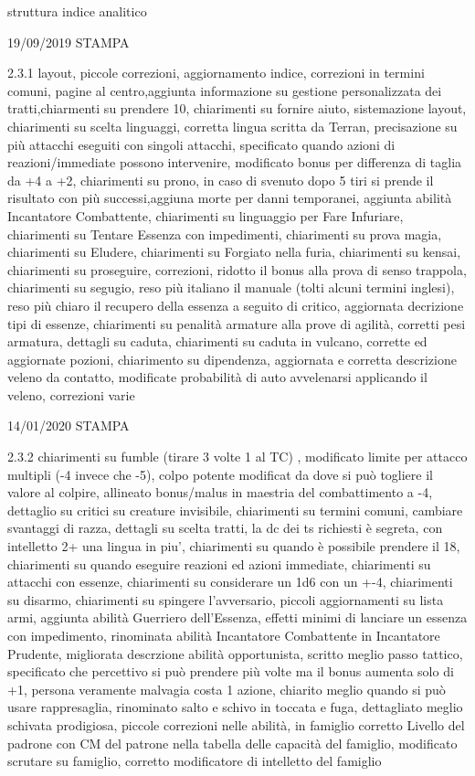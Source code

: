 \documentclass[a4paper,11pt,twoside,openany]{book}
\begin{document}
{{struttura indice analitico

19/09/2019 STAMPA

2.3.1 layout, piccole correzioni, aggiornamento indice, correzioni in termini comuni, pagine al centro,aggiunta informazione su gestione personalizzata dei tratti,chiarmenti su prendere 10, chiarimenti su fornire aiuto, sistemazione layout, chiarimenti su scelta linguaggi, corretta lingua scritta da Terran, precisazione su più attacchi eseguiti con singoli attacchi, specificato quando azioni di reazioni/immediate possono intervenire, modificato bonus per differenza di taglia da +4 a +2, chiarimenti su prono, in caso di svenuto dopo 5 tiri si prende il risultato con più successi,aggiuna morte per danni temporanei, aggiunta abilità Incantatore Combattente, chiarimenti su linguaggio per Fare Infuriare, chiarimenti su Tentare Essenza con impedimenti, chiarimenti su prova magia, chiarimenti su Eludere, chiarimenti su Forgiato nella furia, chiarimenti su kensai, chiarimenti su proseguire, correzioni, ridotto il bonus alla prova di senso trappola, chiarimenti su segugio, reso più italiano il manuale (tolti alcuni termini inglesi), reso più chiaro il recupero della essenza a seguito di critico, aggiornata decrizione tipi di essenze, chiarimenti su penalità armature alla prove di agilità, corretti pesi armatura, dettagli su caduta, chiarimenti su caduta in vulcano, corrette ed aggiornate pozioni, chiarimento su dipendenza, aggiornata e corretta descrizione veleno da contatto, modificate probabilità di auto avvelenarsi applicando il veleno, correzioni varie

14/01/2020 STAMPA

2.3.2 chiarimenti su fumble (tirare 3 volte 1 al TC) , modificato limite per attacco multipli (-4 invece che -5), colpo potente modificat da dove si può togliere il valore al colpire, allineato bonus/malus in maestria del combattimento a -4, dettaglio su critici su creature invisibile, chiarimenti su termini comuni, cambiare svantaggi di razza, dettagli su scelta tratti, la dc dei ts richiesti è segreta, con intelletto 2+ una lingua in piu', chiarimenti su quando è possibile prendere il 18, chiarimenti su quando eseguire reazioni ed azioni immediate, chiarimenti su attacchi con essenze, chiarimenti su considerare un 1d6 con un +-4, chiarimenti su disarmo, chiarimenti su spingere l'avversario, piccoli aggiornamenti su lista armi, aggiunta abilità Guerriero dell'Essenza, effetti minimi di lanciare un essenza con impedimento, rinominata abilità Incantatore Combattente in Incantatore Prudente, migliorata descrzione abilità opportunista, scritto meglio passo tattico, specificato che percettivo si può prendere più volte ma il bonus aumenta solo di +1, persona veramente malvagia costa 1 azione, chiarito meglio quando si può usare rappresaglia, rinominato salto e schivo in toccata e fuga, dettagliato meglio schivata prodigiosa, piccole correzioni nelle abilità, in famiglio corretto Livello del padrone con CM del patrone nella tabella delle capacità del famiglio, modificato scrutare su famiglio, corretto modificatore di intelletto del famiglio

}}
\end{document}
